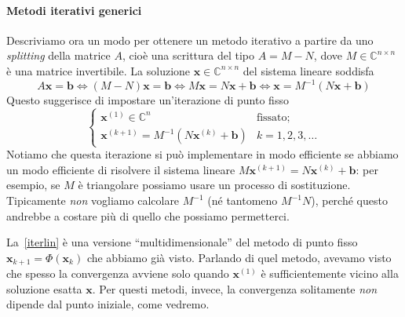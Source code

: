 \documentclass[a4paper]{report}
\theoremstyle{definiton}
\theoremstyle{remark}
\newcommand{\x}{\mathbf{x}}
\renewcommand{\b}{\mathbf{b}}
\begin{document}
\paragraph{Metodi iterativi generici}

Descriviamo ora un modo per ottenere un metodo iterativo a partire da uno \emph{splitting} della matrice $A$, cioè una scrittura del tipo $A = M - N$, dove $M\in\mathbb{C}^{n\times n}$ è una matrice invertibile. La soluzione $\x\in\mathbb{C}^{n\times n}$ del sistema lineare soddisfa
\begin{equation} \label{solsistema}
    A\x = \b \iff (M-N)\x=\b \iff M\x = N\x + \b \iff \x = M^{-1}(N\x + \b)
\end{equation}
Questo suggerisce di impostare un'iterazione di punto fisso
\begin{equation} \label{iterlin}
    \begin{cases}
    \x^{(1)} \in \mathbb{C}^n & \text{fissato};\\
    \x^{(k+1)} = M^{-1}(N\x^{(k)} + \mathbf{b}) & k=1,2,3,\dots
    \end{cases}
\end{equation}
Notiamo che questa iterazione si può implementare in modo efficiente se abbiamo un modo efficiente di risolvere il sistema lineare $M\x^{(k+1)} = N\x^{(k)} + \b$: per esempio, se $M$ è triangolare possiamo usare un processo di sostituzione. Tipicamente \emph{non} vogliamo calcolare $M^{-1}$ (né tantomeno $M^{-1}N$), perché questo andrebbe a costare più di quello che possiamo permetterci.

La~\eqref{iterlin} è una versione ``multidimensionale'' del metodo di punto fisso $\x_{k+1} = \Phi(\x_k)$ che abbiamo già visto. Parlando di quel metodo, avevamo visto che spesso la convergenza avviene solo quando $\x^{(1)}$ è sufficientemente vicino alla soluzione esatta $\x$. Per questi metodi, invece, la convergenza solitamente \emph{non} dipende dal punto iniziale, come vedremo.
\end{document}
